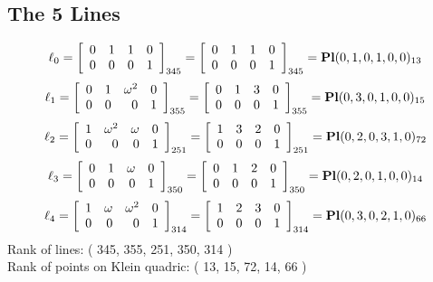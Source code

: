 \documentclass{article}
\begin{document}
{\subsection*{The 5 Lines}
$$
\ell_{0} = 
\left[
\begin{array}{*{4}{r}}
0 & 1 & 1 & 0\\
0 & 0 & 0 & 1\\
\end{array}
\right]
_{345}
=
\left[
\begin{array}{*{4}c}
0  & 1  & 1  & 0\\
0  & 0  & 0  & 1\\
\end{array}
\right]_{345}
={\rm\bf Pl}(0,1,0,1,0,0 )_{13}$$
$$
\ell_{1} = 
\left[
\begin{array}{*{4}{r}}
0 & 1 & \omega^{2} & 0\\
0 & 0 & 0 & 1\\
\end{array}
\right]
_{355}
=
\left[
\begin{array}{*{4}c}
0  & 1  & 3  & 0\\
0  & 0  & 0  & 1\\
\end{array}
\right]_{355}
={\rm\bf Pl}(0,3,0,1,0,0 )_{15}$$
$$
\ell_{2} = 
\left[
\begin{array}{*{4}{r}}
1 & \omega^{2} & \omega  & 0\\
0 & 0 & 0 & 1\\
\end{array}
\right]
_{251}
=
\left[
\begin{array}{*{4}c}
1  & 3  & 2  & 0\\
0  & 0  & 0  & 1\\
\end{array}
\right]_{251}
={\rm\bf Pl}(0,2,0,3,1,0 )_{72}$$
$$
\ell_{3} = 
\left[
\begin{array}{*{4}{r}}
0 & 1 & \omega  & 0\\
0 & 0 & 0 & 1\\
\end{array}
\right]
_{350}
=
\left[
\begin{array}{*{4}c}
0  & 1  & 2  & 0\\
0  & 0  & 0  & 1\\
\end{array}
\right]_{350}
={\rm\bf Pl}(0,2,0,1,0,0 )_{14}$$
$$
\ell_{4} = 
\left[
\begin{array}{*{4}{r}}
1 & \omega  & \omega^{2} & 0\\
0 & 0 & 0 & 1\\
\end{array}
\right]
_{314}
=
\left[
\begin{array}{*{4}c}
1  & 2  & 3  & 0\\
0  & 0  & 0  & 1\\
\end{array}
\right]_{314}
={\rm\bf Pl}(0,3,0,2,1,0 )_{66}$$
Rank of lines: ( 345, 355, 251, 350, 314 )\\
Rank of points on Klein quadric: ( 13, 15, 72, 14, 66 )\\
}
\end{document}
